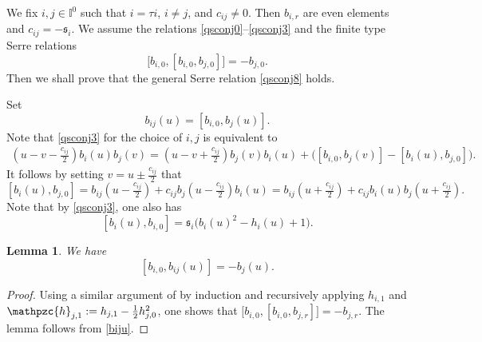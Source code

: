 \documentclass[11pt,reqno]{amsart}
\numberwithin{equation}{section}
\newtheorem{lem}[thm]{Lemma}
\theoremstyle{definition}
\theoremstyle{remark}
\newcommand{\beq}{\begin{equation}}
\newcommand{\eeq}{\end{equation}}
\newcommand{\ka}{{\mathfrak s}}
\def \I{\mathbb{I}}
\begin{document}
We fix $i,j\in\I^0$ such that $i=\tau i$, $i\ne j$, and $c_{ij}\ne 0$. Then $b_{i,r}$ are even elements and $c_{ij}=-\ka_i$. 
We assume the relations \eqref{qsconj0}--\eqref{qsconj3} and the finite type Serre relations 
\beq\label{serre0}
\big[b_{i,0},[b_{i,0},b_{j,0}]\big]=-b_{j,0}.
\eeq
Then we shall prove that the general Serre relation \eqref{qsconj8} holds. 

Set
\beq\label{biju}
b_{ij}(u)=[b_{i,0},b_j(u)].
\eeq
Note that \eqref{qsconj3} for the choice of $i,j$ is equivalent to
\[
\begin{split}
(u-v-\tfrac{c_{ij}}{2}) b_i(u) b_j(v)=(u-v+\tfrac{c_{ij}}{2}) b_j(v) b_i(u)+ \big([ b_{i,0}, b_j(v)]-[ b_i(u), b_{j,0}]\big).
\end{split} 
\]
It follows by setting $v=u\pm \tfrac{c_{ij}}{2}$ that  
\beq\label{bi0bj}
[ b_{i}(u), b_{j,0}]= b_{ij}(u-\tfrac{c_{ij}}{2})+c_{ij} b_j(u-\tfrac{c_{ij}}{2}) b_i(u)= b_{ij}(u+\tfrac{c_{ij}}{2})+c_{ij} b_i(u) b_j(u+\tfrac{c_{ij}}{2}).
\eeq
Note that by \eqref{qsconj3}, one also has
\beq\label{bibi0}
[b_i(u),b_{i,0}]=\ka_i\big(b_i(u)^2- h_i(u)+1\big).
\eeq
\begin{lem}
We have
\beq\label{bijbj}
[b_{i,0},b_{ij}(u)]=-b_j(u).
\eeq
\end{lem}
\begin{proof}
Using a similar argument of \cite[\S4.3]{Lu2023drinfeld} by induction and recursively applying $h_{i,1}$ and $\mathpzc{h}_{j,1}:=h_{j,1}-\frac12h_{j,0}^2$, one shows that $\big[b_{i,0},[b_{i,0},b_{j,r}]\big]=-b_{j,r}$. The lemma follows from \eqref{biju}.
\end{proof}
\end{document}
